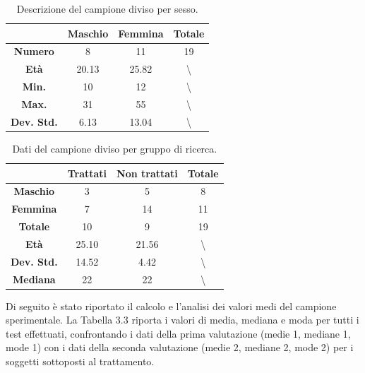 \begin{table}[H]
\begin{center}
\begin{tabular}{|c|c|c|c|} \hline
{\textbf{}} & {\textbf{Maschio}} & {\textbf{Femmina}}& {\textbf{Totale}}\\ \hline
\textbf{Numero} & 8 & 11 & 19 \\ 
\textbf{Età} & 20.13 & 25.82 & \textbackslash \\ 
\textbf{Min.} & 10 & 12 & \textbackslash \\ 
\textbf{Max.} & 31 & 55 & \textbackslash \\ 
\textbf{Dev. Std.} & 6.13 & 13.04 & \textbackslash \\
\hline
\end{tabular}
\end{center}
\caption{Descrizione del campione diviso per sesso.}
\end{table}
\begin{table}[H]
\begin{center}
\begin{tabular}{|c|c|c|c|} \hline
{\textbf{}} & {\textbf{Trattati}} & {\textbf{Non trattati}}& {\textbf{Totale}}\\ \hline
\textbf{Maschio} & 3 & 5 & 8 \\
\textbf{Femmina} & 7 & 14 & 11\\ 
\textbf{Totale} & 10 & 9 & 19 \\ 
\textbf{Età} & 25.10 & 21.56 & \textbackslash \\ 
\textbf{Dev. Std.} & 14.52 & 4.42 & \textbackslash \\
\textbf{Mediana} & 22 & 22 & \textbackslash \\
\hline
\end{tabular}
\end{center}
\caption{Dati del campione diviso per gruppo di ricerca.}
\end{table}

Di seguito è stato riportato il calcolo e l’analisi dei valori medi del campione sperimentale.
La Tabella 3.3 riporta i valori di media, mediana e moda per tutti i test effettuati, confrontando i dati della prima valutazione (medie 1, mediane 1, mode 1) con i dati della seconda valutazione (medie 2, mediane 2, mode 2) per i soggetti sottoposti al trattamento.

